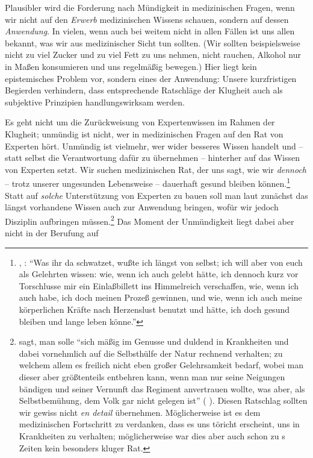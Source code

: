 Plausibler wird die Forderung nach Mündigkeit in medizinischen Fragen, wenn wir
nicht auf den \emph{Erwerb} medizinischen Wissens schauen, sondern auf dessen
\emph{Anwendung}. In vielen, wenn auch bei weitem nicht in allen Fällen ist uns
allen bekannt, was wir aus medizinischer Sicht tun sollten. (Wir sollten
beispielsweise nicht zu viel Zucker und zu viel Fett zu uns nehmen, nicht rauchen,
Alkohol nur in Maßen konsumieren und uns regelmäßig bewegen.) Hier liegt kein
epistemisches Problem vor, sondern eines der Anwendung:
Unsere kurzfristigen Begierden verhindern, dass entsprechende Ratschläge der
Klugheit auch als subjektive Prinzipien handlungswirksam werden.

Es geht  nicht um die Zurückweisung
von Expertenwissen im Rahmen der Klugheit; unmündig ist nicht, wer in
medizinischen Fragen auf den Rat von Experten hört. Unmündig ist vielmehr, wer
wider besseres Wissen handelt und -- statt selbst die Verantwortung dafür zu
übernehmen -- hinterher auf das Wissen von Experten setzt.  Wir
suchen medizinischen Rat, der uns sagt, wie wir \emph{dennoch} -- trotz
unserer ungesunden Lebensweise -- dauerhaft gesund bleiben
können.\footnote{\cite[Vgl.][A 31]{Kant:DerStreitderFakultaeten1977},
\cite[][VII: 30.24--30]{Kant:GesammelteWerke1900ff.}: \enquote{Was ihr
 da schwatzet, wußte ich längst von selbst; ich will aber von euch als Gelehrten
wissen: wie, wenn ich auch  gelebt hätte, ich dennoch kurz vor
Torschlusse mir ein Einlaßbillett ins Himmelreich verschaffen, wie, wenn ich
auch  habe, ich doch meinen Prozeß gewinnen, und wie, wenn ich
auch meine körperlichen Kräfte nach Herzenslust benutzt und 
hätte, ich doch gesund bleiben und lange leben könne.}} Statt auf \emph{solche}
Unterstützung von Experten zu bauen soll man laut  zunächst
das längst vorhandene Wissen auch zur Anwendung bringen, wofür wir jedoch
Disziplin aufbringen müssen.\footnote{ sagt, man solle
  \enquote{sich mäßig im Genusse und duldend in Krankheiten und dabei
  vornehmlich auf die Selbsthülfe der Natur rechnend {\punkt} verhalten; zu welchem allem es
  freilich nicht eben großer Gelehrsamkeit bedarf, wobei man dieser aber
  größtenteils entbehren kann, wenn man nur seine Neigungen bändigen und seiner
  Vernunft das Regiment anvertrauen wollte, was aber, als Selbstbemühung, dem
  Volk gar nicht gelegen ist} \mkbibparens{\cite[][A
  30\,f.,]{Kant:DerStreitderFakultaeten1977} \cite[][VII:
  30.14--19]{Kant:GesammelteWerke1900ff.}}.
Diesen Ratschlag sollten wir gewiss nicht \emph{en detail} übernehmen.
Möglicherweise ist es dem medizinischen Fortschritt zu verdanken, dass es uns töricht
erscheint, uns in Krankheiten  zu verhalten; möglicherweise
war dies aber auch schon zu s Zeiten kein besonders kluger
Rat.} Das Moment der Unmündigkeit liegt dabei aber nicht in der Berufung auf
